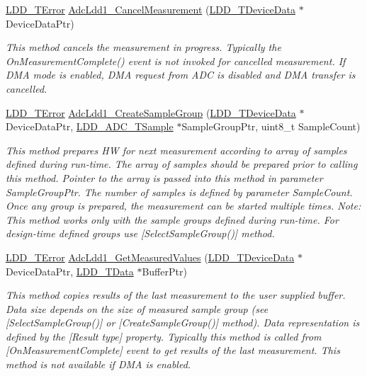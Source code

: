 \begin{DoxyCompactItemize}
\hyperlink{group___p_e___types__module_ga24c2b045fd04e79e85f261ce4df35588}{L\+D\+D\+\_\+\+T\+Error} \hyperlink{group___adc_ldd1__module_ga26924e7e4ca2c272140fbaf6ecf9c18d}{Adc\+Ldd1\+\_\+\+Cancel\+Measurement} (\hyperlink{group___p_e___types__module_gac5cf1362f1f0e3a2ce71b1bf2276d091}{L\+D\+D\+\_\+\+T\+Device\+Data} $\ast$Device\+Data\+Ptr)
\begin{DoxyCompactList}\small\item\em This method cancels the measurement in progress. Typically the On\+Measurement\+Complete() event is not invoked for cancelled measurement. If D\+MA mode is enabled, D\+MA request from A\+DC is disabled and D\+MA transfer is cancelled. \end{DoxyCompactList}\item 
\hyperlink{group___p_e___types__module_ga24c2b045fd04e79e85f261ce4df35588}{L\+D\+D\+\_\+\+T\+Error} \hyperlink{group___adc_ldd1__module_ga86203c058acad0397b653ce3a4a625a4}{Adc\+Ldd1\+\_\+\+Create\+Sample\+Group} (\hyperlink{group___p_e___types__module_gac5cf1362f1f0e3a2ce71b1bf2276d091}{L\+D\+D\+\_\+\+T\+Device\+Data} $\ast$Device\+Data\+Ptr, \hyperlink{struct_l_d_d___a_d_c___t_sample}{L\+D\+D\+\_\+\+A\+D\+C\+\_\+\+T\+Sample} $\ast$Sample\+Group\+Ptr, uint8\+\_\+t Sample\+Count)
\begin{DoxyCompactList}\small\item\em This method prepares HW for next measurement according to array of samples defined during run-\/time. The array of samples should be prepared prior to calling this method. Pointer to the array is passed into this method in parameter Sample\+Group\+Ptr. The number of samples is defined by parameter Sample\+Count. Once any group is prepared, the measurement can be started multiple times. Note\+: This method works only with the sample groups defined during run-\/time. For design-\/time defined groups use \mbox{[}Select\+Sample\+Group()\mbox{]} method. \end{DoxyCompactList}\item 
\hyperlink{group___p_e___types__module_ga24c2b045fd04e79e85f261ce4df35588}{L\+D\+D\+\_\+\+T\+Error} \hyperlink{group___adc_ldd1__module_ga30f524b93639b958a529d6f91c41ce6d}{Adc\+Ldd1\+\_\+\+Get\+Measured\+Values} (\hyperlink{group___p_e___types__module_gac5cf1362f1f0e3a2ce71b1bf2276d091}{L\+D\+D\+\_\+\+T\+Device\+Data} $\ast$Device\+Data\+Ptr, \hyperlink{group___p_e___types__module_gade8ef9401405bd941b6da738b807f980}{L\+D\+D\+\_\+\+T\+Data} $\ast$Buffer\+Ptr)
\begin{DoxyCompactList}\small\item\em This method copies results of the last measurement to the user supplied buffer. Data size depends on the size of measured sample group (see \mbox{[}Select\+Sample\+Group()\mbox{]} or \mbox{[}Create\+Sample\+Group()\mbox{]} method). Data representation is defined by the \mbox{[}Result type\mbox{]} property. Typically this method is called from \mbox{[}On\+Measurement\+Complete\mbox{]} event to get results of the last measurement. This method is not available if D\+MA is enabled. \end{DoxyCompactList}\item 

\end{DoxyCompactItemize}

